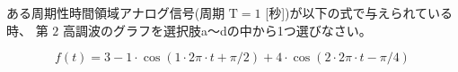 ある周期性時間領域アナログ信号(周期 $\textrm{T} = 1$ [秒])が以下の式で与えられている時、
第 $2$ 高調波のグラフを選択肢a〜dの中から1つ選びなさい。

\[
f(t) = 
3
-1 \cdot \cos( 1 \cdot 2 \pi \cdot t + \pi/2 )
+4 \cdot \cos( 2 \cdot 2 \pi \cdot t - \pi/4 )
\]
